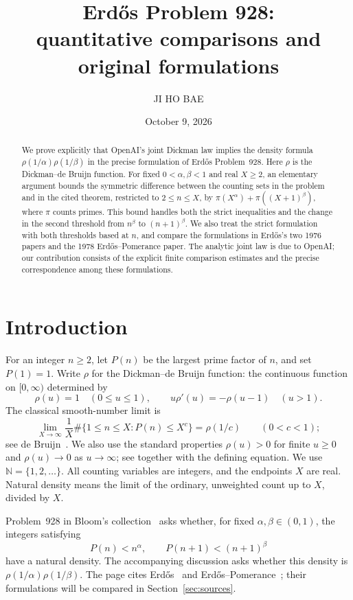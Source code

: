 \documentclass[11pt,a4paper]{amsart}
\title[Erd\H{o}s Problem 928 and the joint Dickman law]{Erd\H{o}s Problem 928:\\
quantitative comparisons and original formulations}
\author{JI HO BAE}
\date{October 9, 2026}
\newcommand{\N}{\mathbb N}
\begin{document}
\begin{abstract}
We prove explicitly that OpenAI's joint Dickman law implies the density
formula $\rho(1/\alpha)\rho(1/\beta)$ in the precise formulation of
Erd\H{o}s Problem~928. Here $\rho$ is the Dickman--de Bruijn function.
For fixed $0<\alpha,\beta<1$ and real $X\ge2$, an elementary argument
bounds the symmetric difference between the counting sets in the problem
and in the cited theorem, restricted to $2\le n\le X$, by
$\pi(X^\alpha)+\pi((X+1)^\beta)$, where $\pi$ counts primes.
This bound handles both the strict inequalities and the change in the
second threshold from $n^\beta$ to $(n+1)^\beta$. We also treat the
strict formulation with both thresholds based at $n$, and compare the
formulations in Erd\H{o}s's two 1976 papers and the 1978
Erd\H{o}s--Pomerance paper. The analytic joint law is due to OpenAI;
our contribution consists of the explicit finite comparison estimates
and the precise correspondence among these formulations.
\end{abstract}
\maketitle

\section{Introduction}

For an integer $n\ge2$, let $P(n)$ be the largest prime factor of $n$, and set
$P(1)=1$. Write $\rho$ for the Dickman--de Bruijn function: the continuous
function on $[0,\infty)$ determined by
\[
 \rho(u)=1\quad(0\le u\le1),\qquad
 u\rho'(u)=-\rho(u-1)\quad(u>1).
\]
The classical smooth-number limit is
\begin{equation}\label{eq:marginal}
 \lim_{X\to\infty}\frac1X
 \#\{1\le n\le X:P(n)\le X^c\}=\rho(1/c)
 \qquad(0<c<1);
\end{equation}
see de Bruijn~\cite[p.~51, (1.1)--(1.2)]{deBruijn1951}.
We also use the standard properties $\rho(u)>0$ for finite $u\ge0$
and $\rho(u)\to0$ as $u\to\infty$; see
\cite[p.~52, (1.8)]{deBruijn1951} together with the defining equation.
We use $\N=\{1,2,\ldots\}$. All counting variables are integers, and
the endpoints $X$ are real. Natural density means the limit of the
ordinary, unweighted count up to $X$, divided by $X$.

Problem~928 in Bloom's collection~\cite{Bloom928} asks whether, for fixed
$\alpha,\beta\in(0,1)$, the integers satisfying
\begin{equation}\label{eq:problem}
 P(n)<n^\alpha,\qquad P(n+1)<(n+1)^\beta
\end{equation}
have a natural density. The accompanying discussion asks whether this
density is $\rho(1/\alpha)\rho(1/\beta)$. The page cites
Erd\H{o}s~\cite{Erdos1976Manitoba,Erdos1976Debrecen} and
Erd\H{o}s--Pomerance~\cite{ErdosPomerance1978}; their formulations will
be compared in Section~\ref{sec:sources}.
\end{document}
